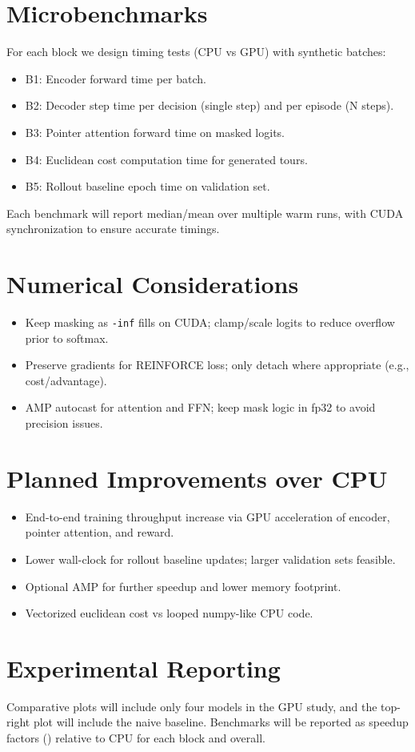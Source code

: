 \documentclass[11pt]{article}
\begin{document}
\section{Microbenchmarks}
For each block we design timing tests (CPU vs GPU) with synthetic batches:
\begin{itemize}[noitemsep]
  \item B1: Encoder forward time per batch.
  \item B2: Decoder step time per decision (single step) and per episode (N steps).
  \item B3: Pointer attention forward time on masked logits.
  \item B4: Euclidean cost computation time for generated tours.
  \item B5: Rollout baseline epoch time on validation set.
\end{itemize}
Each benchmark will report median/mean over multiple warm runs, with CUDA synchronization to ensure accurate timings.

\section{Numerical Considerations}
\begin{itemize}[noitemsep]
  \item Keep masking as \texttt{-inf} fills on CUDA; clamp/scale logits to reduce overflow prior to softmax.
  \item Preserve gradients for REINFORCE loss; only detach where appropriate (e.g., cost/advantage).
  \item AMP autocast for attention and FFN; keep mask logic in fp32 to avoid precision issues.
\end{itemize}

\section{Planned Improvements over CPU}
\begin{itemize}[noitemsep]
  \item End-to-end training throughput increase via GPU acceleration of encoder, pointer attention, and reward.
  \item Lower wall-clock for rollout baseline updates; larger validation sets feasible.
  \item Optional AMP for further speedup and lower memory footprint.
  \item Vectorized euclidean cost vs looped numpy-like CPU code.
\end{itemize}

\section{Experimental Reporting}
Comparative plots will include only four models in the GPU study, and the top-right plot will include the naive baseline. Benchmarks will be reported as speedup factors (\si{\times}) relative to CPU for each block and overall.
\end{document}
